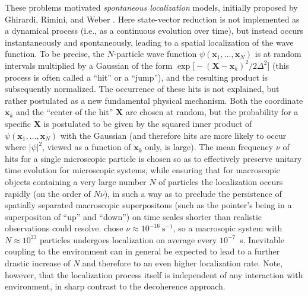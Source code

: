 \documentclass[twocolumn,rmp,aps,amsmath,amsfonts,noshowkeys,noshowpacs]{revtex4}
\begin{document}
These problems motivated {\em spontaneous localization} models,
initially proposed by Ghirardi, Rimini, and Weber
\citep[GRW;][]{Ghirardi:1986:ud}. Here state-vector reduction is not
implemented as a dynamical process (i.e., as a continuous evolution
over time), but instead occurs instantaneously and spontaneously,
leading to a spatial localization of the wave function. To be precise,
the $N$-particle wave function $\psi(\mathbf{x}_1, \hdots,
\mathbf{x}_N)$ is at random intervals multiplied by a Gaussian of the
form $\exp \bigl[ -(\mathbf{X}-\mathbf{x}_k)^2 / 2\Delta^2 \bigr]$
(this process is often called a ``hit'' or a ``jump''), and the
resulting product is subsequently normalized.  The occurrence of these
hits is not explained, but rather postulated as a new fundamental
physical mechanism. Both the coordinate $\mathbf{x}_k$ and the
``center of the hit'' $\mathbf{X}$ are chosen at random, but the
probability for a specific $\mathbf{X}$ is postulated to be given by
the squared inner product of $\psi(\mathbf{x}_1, \hdots,
\mathbf{x}_N)$ with the Gaussian (and therefore hits are more likely
to occur where $|\psi|^2$, viewed as a function of $\mathbf{x}_k$
only, is large).  The mean frequency $\nu$ of hits for a single
microscopic particle is chosen so as to effectively preserve unitary
time evolution for microscopic systems, while ensuring that for
macroscopic objects containing a very large number $N$ of particles
the localization occurs rapidly (on the order of $N\nu$), in such a
way as to preclude the persistence of spatially separated macroscopic
superpositons (such as the pointer's being in a superpositon of ``up''
and ``down'') on time scales shorter than realistic observations could
resolve. \citet{Ghirardi:1986:ud} chose $\nu \approx
10^{-16}~\text{s}^{-1}$, so a macrosopic system with $N \approx
10^{23}$ particles undergoes localization on average every
$10^{-7}$~s.  Inevitable coupling to the environment can in
general be expected to lead to a further drastic increase of $N$ and
therefore to an even higher localization rate. Note, however, that the
localization process itself is independent of any interaction
with environment, in sharp contrast to the decoherence approach.
\end{document}
